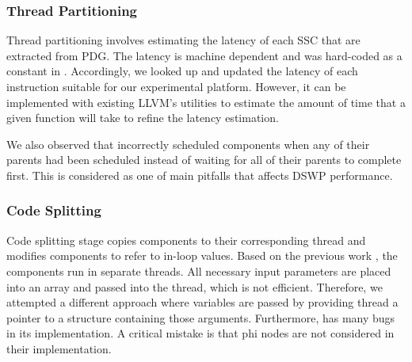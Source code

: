 \documentclass[letterpaper, 10 pt, conference]{ieeeconf}  %
\begin{document}
\subsubsection{Thread Partitioning}

Thread partitioning involves estimating the latency of each SSC that are extracted from PDG. The latency is machine dependent and was hard-coded as a constant in \cite{c2}. Accordingly, we looked up and updated the latency of each instruction suitable for our experimental platform. However, it can be implemented with existing LLVM's utilities to estimate the amount of time that a given function will take to refine the latency estimation. 

We also observed that \cite{c2} incorrectly scheduled components when any of their parents had been scheduled instead of waiting for all of their parents to complete first. This is considered as one of main pitfalls that affects DSWP performance. 

\subsubsection{Code Splitting} 
Code splitting stage copies components to their corresponding thread and modifies components to refer to in-loop values. Based on the previous work \cite{c2}, the components run in separate threads. All necessary input parameters are placed into an array and passed into the thread, which is not efficient. Therefore, we attempted a different approach where variables are passed by providing thread a pointer to a structure containing those arguments. Furthermore, \cite{c2} has many bugs in its implementation. A critical mistake is that phi nodes are not considered in their implementation.
\end{document}
